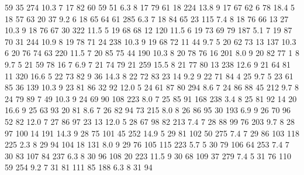 \documentclass[a4paper,11pt]{article}
\begin{document}
\begin{rcode}
59     35     274 10.3     7  17   82
60     59      51  6.3     8  17   79
61     18     224 13.8     9  17   67
62      6      78 18.4     5  18   57
63     20      37  9.2     6  18   65
64     61     285  6.3     7  18   84
65     23     115  7.4     8  18   76
66     13      27 10.3     9  18   76
67     30     322 11.5     5  19   68
68     12     120 11.5     6  19   73
69     79     187  5.1     7  19   87
70     31     244 10.9     8  19   78
71     24     238 10.3     9  19   68
72     11      44  9.7     5  20   62
73     13     137 10.3     6  20   76
74     63     220 11.5     7  20   85
75     44     190 10.3     8  20   78
76     16     201  8.0     9  20   82
77      1       8  9.7     5  21   59
78     16       7  6.9     7  21   74
79     21     259 15.5     8  21   77
80     13     238 12.6     9  21   64
81     11     320 16.6     5  22   73
82      9      36 14.3     8  22   72
83     23      14  9.2     9  22   71
84      4      25  9.7     5  23   61
85     36     139 10.3     9  23   81
86     32      92 12.0     5  24   61
87     80     294  8.6     7  24   86
88     45     212  9.7     8  24   79
89      7      49 10.3     9  24   69
90    108     223  8.0     7  25   85
91    168     238  3.4     8  25   81
92     14      20 16.6     9  25   63
93     20      81  8.6     7  26   82
94     73     215  8.0     8  26   86
95     30     193  6.9     9  26   70
96     52      82 12.0     7  27   86
97     23      13 12.0     5  28   67
98     82     213  7.4     7  28   88
99     76     203  9.7     8  28   97
100    14     191 14.3     9  28   75
101    45     252 14.9     5  29   81
102    50     275  7.4     7  29   86
103   118     225  2.3     8  29   94
104    18     131  8.0     9  29   76
105   115     223  5.7     5  30   79
106    64     253  7.4     7  30   83
107    84     237  6.3     8  30   96
108    20     223 11.5     9  30   68
109    37     279  7.4     5  31   76
110    59     254  9.2     7  31   81
111    85     188  6.3     8  31   94
\end{rcode}
\end{document}
